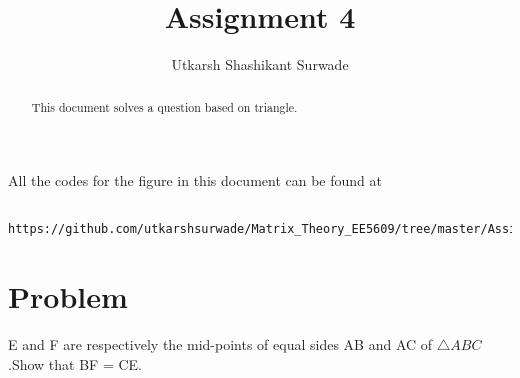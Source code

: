 \documentclass[journal,12pt,twocolumn]{IEEEtran}
\begin{document}
 \makeatletter
 \makeatother
 \let\StandardTheFigure\thefigure
 \let\vec\mathbf
 \renewcommand{\thefigure}{\theproblem}
 \def\putbox#1#2#3{\makebox[0in][l]{\makebox[#1][l]{}\raisebox{\baselineskip}[0in][0in]{\raisebox{#2}[0in][0in]{#3}}}}
      \def\rightbox#1{\makebox[0in][r]{#1}}
      \def\centbox#1{\makebox[0in]{#1}}
      \def\topbox#1{\raisebox{-\baselineskip}[0in][0in]{#1}}
      \def\midbox#1{\raisebox{-0.5\baselineskip}[0in][0in]{#1}}
 \vspace{3cm}
 \title{Assignment 4}
 \author{Utkarsh Shashikant Surwade}
 \maketitle
 \newpage
 \bigskip
 \renewcommand{\thefigure}{\theenumi}
 \renewcommand{\thetable}{\theenumi}
 \begin{abstract}
 This document solves a question based on triangle.
 \end{abstract}
 All the codes for the figure in this document can be found at
 \begin{lstlisting}
 https://github.com/utkarshsurwade/Matrix_Theory_EE5609/tree/master/Assignment4
 \end{lstlisting}
 \section{Problem}
 E and F are respectively the mid-points of equal sides AB and AC of $\triangle{ABC}$.Show that BF = CE.
\end{document}
